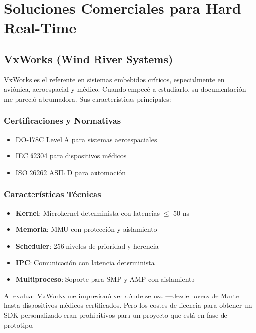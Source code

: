 \newpage
\section{Soluciones Comerciales para Hard Real-Time}

    \subsection{VxWorks (Wind River Systems)}
        VxWorks es el referente en sistemas embebidos críticos, especialmente en aviónica, aeroespacial y médico. Cuando empecé a estudiarlo, su documentación me pareció abrumadora. Sus características principales:

        \subsubsection{Certificaciones y Normativas}
            \begin{itemize}
                \item DO-178C Level A para sistemas aeroespaciales
                \item IEC 62304 para dispositivos médicos
                \item ISO 26262 ASIL D para automoción
            \end{itemize}
        \subsubsection{Características Técnicas}
            \begin{itemize}
                \item \textbf{Kernel}: Microkernel determinista con latencias $\le$ 50 ns
                \item \textbf{Memoria}: MMU con protección y aislamiento
                \item \textbf{Scheduler}: 256 niveles de prioridad y herencia
                \item \textbf{IPC}: Comunicación con latencia determinista
                \item \textbf{Multiproceso}: Soporte para SMP y AMP con aislamiento
            \end{itemize}

        Al evaluar VxWorks me impresionó ver dónde se usa —desde rovers de Marte hasta dispositivos médicos certificados. Pero los costes de licencia para obtener un SDK personalizado eran prohibitivos para un proyecto que está en fase de prototipo.

